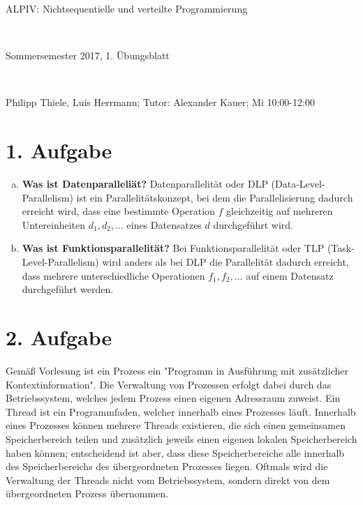 \documentclass[numbers=noendperiod]{scrartcl}
\begin{document}
	
	
\hrulefill
\begin{center}
	\bfseries %
	\sffamily %
	\begin{huge}
		ALPIV: Nichtsequentielle und verteilte Programmierung
	\end{huge}\\
	\begin{Large}
		Sommersemester 2017, 1. Übungsblatt
	\end{Large}\\
	\begin{small}
		Philipp Thiele, Luis Herrmann; Tutor: Alexander Kauer; Mi 10:00-12:00
	\end{small}
	
	\vspace{-10pt}
\end{center}
\hrulefill

\newcommand{\inputmintedframed}[2]{
	\begin{mdframed}[linecolor=bg,backgroundcolor=bg]
		\inputminted[mathescape,breaklines,linenos,numbersep=5pt,tabsize=3]{#1}{#2}
\end{mdframed}}

\section*{1. Aufgabe}
\begin{enumerate}[a)]
	\item \textbf{Was ist Datenparalleliät?} Datenparallelität oder DLP (Data-Level-Parallelism) ist ein Parallelitätskonzept, bei dem die Parallelisierung dadurch erreicht wird, dass eine bestimmte Operation $f$ gleichzeitig auf mehreren Untereinheiten $d_1,d_2,...$ eines Datensatzes $d$ durchgeführt wird.
	\item \textbf{Was ist Funktionsparallelität?} Bei Funktionsparallelität oder TLP (Task-Level-Parallelism) wird anders als bei DLP die Parallelität dadurch erreicht, dass mehrere unterschiedliche Operationen $f_1,f_2,...$ auf einem Datensatz durchgeführt werden.
\end{enumerate}

\section*{2. Aufgabe}
Gemäß Vorlesung ist ein Prozess ein "Programm in Ausführung mit zusätzlicher Kontextinformation". Die Verwaltung von Prozessen erfolgt dabei durch das Betriebssystem, welches jedem Prozess einen eigenen Adressraum zuweist. Ein Thread ist ein Programmfaden, welcher innerhalb eines Prozesses läuft. Innerhalb eines Prozesses können mehrere Threads existieren, die sich einen gemeinsamen Speicherbereich teilen und zusätzlich jeweils einen eigenen lokalen Speicherbereich haben können; entscheidend ist aber, dass diese Speicherbereiche alle innerhalb des Speicherbereichs des übergeordneten Prozesses liegen. Oftmals wird die Verwaltung der Threads nicht vom Betriebssystem, sondern direkt von dem übergeordneten Prozess übernommen. 
\end{document}
